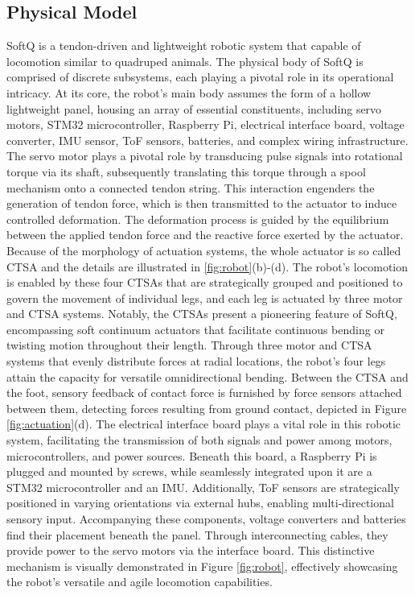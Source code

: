 \subsection{Physical Model}
SoftQ is a tendon-driven and lightweight robotic system that capable of locomotion similar to quadruped animals. The physical body of SoftQ is comprised of discrete subsystems, each playing a pivotal role in its operational intricacy. At its core, the robot's main body assumes the form of a hollow lightweight panel, housing an array of essential constituents, including servo motors, STM32 microcontroller, Raspberry Pi, electrical interface board, voltage converter, \ac{IMU} sensor, \ac{ToF} sensors, batteries, and complex wiring infrastructure. The servo motor plays a pivotal role by transducing pulse signals into rotational torque via its shaft, subsequently translating this torque through a spool mechanism onto a connected tendon string. This interaction engenders the generation of tendon force, which is then transmitted to the actuator to induce controlled deformation. The deformation process is guided by the equilibrium between the applied tendon force and the reactive force exerted by the actuator. Because of the morphology of actuation systems, the whole actuator is so called \ac{CTSA} and the details are illustrated in \ref{fig:robot}(b)-(d). The robot's locomotion is enabled by these four \ac{CTSA}s that are strategically grouped and positioned to govern the movement of individual legs, and each leg is actuated by three motor and \ac{CTSA} systems.  Notably, the \ac{CTSA}s present a pioneering feature of SoftQ, encompassing soft continuum actuators that facilitate continuous bending or twisting motion throughout their length. Through three motor and \ac{CTSA} systems that evenly distribute forces at radial locations, the robot's four legs attain the capacity for versatile omnidirectional bending\cite{jiOmnidirectionalWalkingQuadruped2022}. Between the \ac{CTSA} and the foot, sensory feedback of contact force is furnished by force sensors attached between them, detecting forces resulting from ground contact, depicted in Figure \ref{fig:actuation}(d). The electrical interface board plays a vital role in this robotic system, facilitating the transmission of both signals and power among motors, microcontrollers, and power sources. Beneath this board, a Raspberry Pi is plugged and mounted by screws, while seamlessly integrated upon it are a STM32 microcontroller and an \ac{IMU}. Additionally, \ac{ToF} sensors are strategically positioned in varying orientations via external hubs, enabling multi-directional sensory input. Accompanying these components, voltage converters and batteries find their placement beneath the panel. Through interconnecting cables, they provide power to the servo motors via the interface board. This distinctive mechanism is visually demonstrated in Figure \ref{fig:robot}, effectively showcasing the robot's versatile and agile locomotion capabilities.

